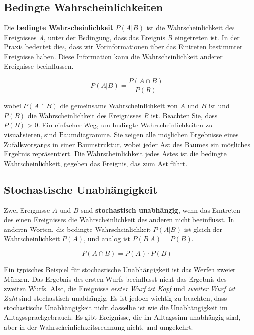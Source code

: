\subsection{Bedingte Wahrscheinlichkeiten}

Die \textbf{bedingte Wahrscheinlichkeit} $P(A|B)$ ist die Wahrscheinlichkeit des Ereignisses $A$, unter der Bedingung, dass das Ereignis $B$ eingetreten ist.
In der Praxis bedeutet dies, dass wir Vorinformationen über das Eintreten bestimmter Ereignisse haben.
Diese Information kann die Wahrscheinlichkeit anderer Ereignisse beeinflussen.

\begin{equation}
    P(A|B) = \frac{P(A \cap B)}{P(B)}
\end{equation}

wobei $P(A \cap B)$ die gemeinsame Wahrscheinlichkeit von $A$ und $B$ ist und $P(B)$ die Wahrscheinlichkeit des Ereignisses $B$ ist.
Beachten Sie, dass $P(B) > 0$.
\newline \newline
Ein einfacher Weg, um bedingte Wahrscheinlichkeiten zu visualisieren, sind Baumdiagramme.
Sie zeigen alle möglichen Ergebnisse eines Zufallsvorgangs in einer Baumstruktur, wobei jeder Ast des Baumes ein mögliches Ergebnis repräsentiert.
Die Wahrscheinlichkeit jedes Astes ist die bedingte Wahrscheinlichkeit, gegeben das Ereignis, das zum Ast führt.

\subsection{Stochastische Unabhängigkeit}

Zwei Ereignisse $A$ und $B$ sind \textbf{stochastisch unabhängig}, wenn das Eintreten des einen Ereignisses die Wahrscheinlichkeit des anderen nicht beeinflusst.
In anderen Worten, die bedingte Wahrscheinlichkeit $P(A|B)$ ist gleich der Wahrscheinlichkeit $P(A)$, und analog ist $P(B|A) = P(B)$.

\begin{equation}
    P(A \cap B) = P(A) \cdot P(B)
\end{equation}

Ein typisches Beispiel für stochastische Unabhängigkeit ist das Werfen zweier Münzen.
Das Ergebnis des ersten Wurfs beeinflusst nicht das Ergebnis des zweiten Wurfs.
Also, die Ereignisse \textit{erster Wurf ist Kopf} und \textit{zweiter Wurf ist Zahl} sind stochastisch unabhängig.
\newline \newline
Es ist jedoch wichtig zu beachten, dass stochastische Unabhängigkeit nicht dasselbe ist wie die Unabhängigkeit im Alltagssprachgebrauch.
Es gibt Ereignisse, die im Alltagssinn unabhängig sind, aber in der Wahrscheinlichkeitsrechnung nicht, und umgekehrt.


